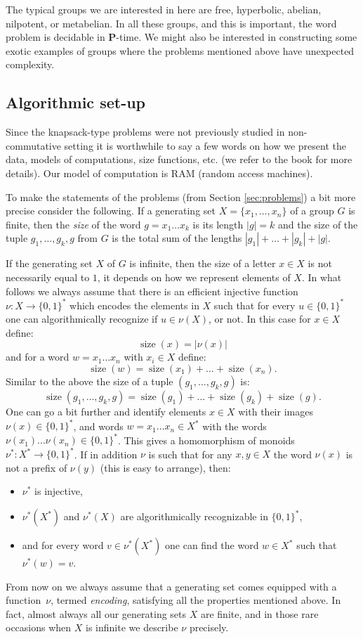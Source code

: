 \documentclass[10pt]{amsart}
\theoremstyle{definition}
\DeclareMathOperator{\size}{{size}}
\def\P{{\mathbf{P}}}
\begin{document}
The typical groups we are interested in here are free,  hyperbolic, abelian, nilpotent, or metabelian.  In all these groups, and this is important, the word problem is decidable in $\P$-time. We might also be interested in constructing some exotic examples of groups where the problems mentioned above have unexpected complexity.

\subsection{Algorithmic set-up}\label{sub:setup}
Since the knapsack-type problems were not previously studied in non-commutative setting
it is worthwhile to say a few words on how we present the data,
models of computations, size functions,  etc.
(we refer to the book \cite{MSU_book:2011} for more details).
Our model of computation is RAM (random access machines).

To make the statements of the problems (from Section \ref{sec:problems})
a bit more precise consider the following. If a  generating set $X = \{x_1,\ldots,x_n\}$ of a
group $G$  is finite, then the {\em size}
of the word $g = x_1\ldots x_k$ is its length $|g|=k$ and the size of
the tuple $g_1, \ldots, g_k, g$ from $G$
is the total sum of the lengths $|g_1| + \ldots +|g_k| +|g|$.


If the generating set $X$ of  $G$ is infinite,
then the size of a letter $x \in X$ is not necessarily equal to $1$,
it depends on how we represent elements of $X$.
In what follows we always assume that there is an efficient injective function $\nu: X \to \{0,1\}^*$ which encodes the elements in $X$
such that for every $u \in \{0,1\}^*$ one can algorithmically recognize if $u \in \nu(X)$, or not.
In this case for $x\in X$ define:
    $$\size(x) = |\nu(x)|$$
and for a word $w  = x_1 \ldots x_n$ with $x_i\in X$ define:
    $$\size(w) = \size(x_1) + \ldots + \size(x_n).$$
Similar to the above the size of a tuple $(g_1, \ldots, g_k, g)$ is:
    $$\size(g_1, \ldots, g_k, g) = \size(g_1) + \ldots + \size(g_k) +\size(g).$$
One can go a bit further and identify elements $x \in X$ with their images $\nu(x) \in \{0,1\}^*$,
and words $w  = x_1 \ldots x_n \in X^*$ with the words $\nu(x_1) \ldots \nu(x_n) \in \{0,1\}^*$.
This gives a homomorphism of monoids $\nu^*: X^* \to \{0,1\}^*$.
If in addition $\nu$ is such that for any $x,y \in X$
the word $\nu(x)$ is not a prefix of $\nu(y)$ (this is easy to arrange),
then:
\begin{itemize}
    \item
$\nu^*$ is injective,
    \item
$\nu^*(X^*)$ and $\nu^*(X)$ are algorithmically recognizable in $\{0,1\}^*$,
    \item
and for every word $v \in \nu^*(X^*)$ one can find the word $w \in X^*$ such that $\nu^*(w) = v$.
\end{itemize}
From now on we always assume that a generating set comes equipped with a function~$\nu$, termed {\it encoding},  satisfying
all the properties mentioned above.
In fact, almost  always all our generating sets $X$ are finite, and in those rare occasions when $X$ is infinite we describe $\nu$ precisely.
\end{document}
